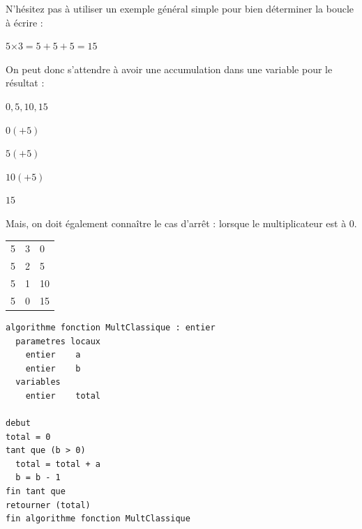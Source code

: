 \documentclass[11pt,a4paper]{article}
\begin{document}

\bigskip

\vspace*{0.5cm}

\bigskip

N'hésitez pas à utiliser un exemple général simple pour bien déterminer la boucle à écrire :
\begin{center}

$ 5 \text{×} 3 = 5 + 5 + 5 = 15 $

\end{center}

\bigskip

On peut donc s'attendre à avoir une accumulation dans une variable pour le résultat :
\begin{center}

$ 0, 5, 10, 15 $

\bigskip

$ 0 (+ 5) $

$ 5 (+ 5) $

$ 10 (+ 5) $

$ 15 $
\end{center}

\bigskip

Mais, on doit également connaître le cas d'arrêt : lorsque le multiplicateur est à $ 0 $.


\begin{center}
\begin{tabular}{|C{1cm}|C{1cm}|C{1cm}|}
  & 3 &  0 \\
  5 & 2 &  5 \\
  5 & 1 & 10 \\
  5 & 0 & 15 \\
 \hline
\end{tabular}
\end{center}


\newpage

\vfillFirst

\begin{table}[ht!]
  \centering
\begin{lstlisting}[style=algorithmique]
algorithme fonction MultClassique : entier
  parametres locaux
    entier    a
    entier    b
  variables
    entier    total

debut
total = 0
tant que (b > 0)
  total = total + a
  b = b - 1
fin tant que
retourner (total)
fin algorithme fonction MultClassique \end{lstlisting}
\end{table}
\end{document}
